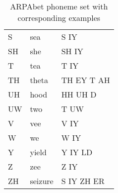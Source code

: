 \begin{table}[!htbp]
\begin{tabular}{|l|l|l|}
    S       & sea     & S IY        \\
    SH      & she     & SH IY       \\
    T       & tea     & T IY        \\
    TH      & theta   & TH EY T AH  \\
    UH      & hood    & HH UH D     \\
    UW      & two     & T UW        \\
    V       & vee     & V IY        \\
    W       & we      & W IY        \\
    Y       & yield   & Y IY LD     \\
    Z       & zee     & Z IY        \\
    ZH      & seizure & S IY ZH ER  \\ \hline
    \end{tabular}
    \caption{ARPAbet phoneme set with corresponding examples}
\end{table}


